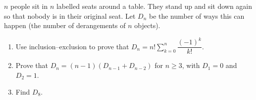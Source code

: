 $n$ people sit in $n$ labelled seats around a table. They stand up and sit down again so that nobody is in their original seat. Let $D_n$ be the number of ways this can happen (the number of derangements of $n$ objects).
\begin{enumerate}
\item[(a)] Use inclusion--exclusion to prove that $D_n=n!\displaystyle\sum_{k=0}^{n}\dfrac{(-1)^k}{k!}$.
\item[(b)] Prove that $D_n=(n-1)\left(D_{n-1}+D_{n-2}\right)$ for $n\ge3$, with $D_1=0$ and $D_2=1$.
\item[(c)] Find $D_8$.
\end{enumerate}
